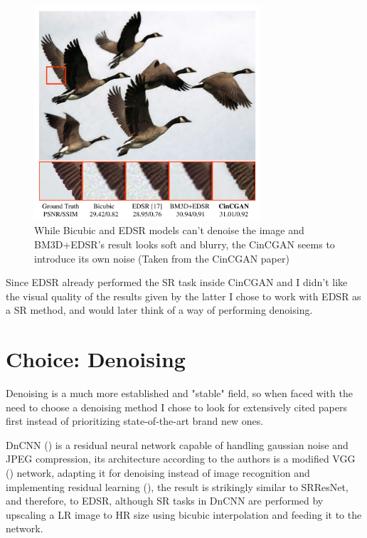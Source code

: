 \begin{figure}[H]
\centering
\includegraphics[width=0.75\textwidth]{../Figures/CinCGAN1}
\caption{While Bicubic and EDSR models can't denoise the image and BM3D+EDSR's result looks soft and blurry, the CinCGAN seems to introduce its own noise (Taken from the CinCGAN paper)}
\end{figure}

Since EDSR already performed the SR task inside CinCGAN and I didn't like the visual quality of the results given by the latter I chose to work with EDSR as a SR method, and would later think of a way of performing denoising.

\section{Choice: Denoising}

Denoising is a much more established and "stable" field, so when faced with the need to choose a denoising method I chose to look for extensively cited papers first instead of prioritizing state-of-the-art brand new ones.

\hfill

DnCNN (\cite{DnCNN}) is a residual neural network capable of handling gaussian noise and JPEG compression, its architecture according to the authors is a modified VGG (\cite{VGG}) network, adapting it for denoising instead of image recognition and implementing residual learning (\cite{ResNet}), the result is strikingly similar to SRResNet, and therefore, to EDSR, although SR tasks in DnCNN are performed by upscaling a LR image to HR size using bicubic interpolation and feeding it to the network.


